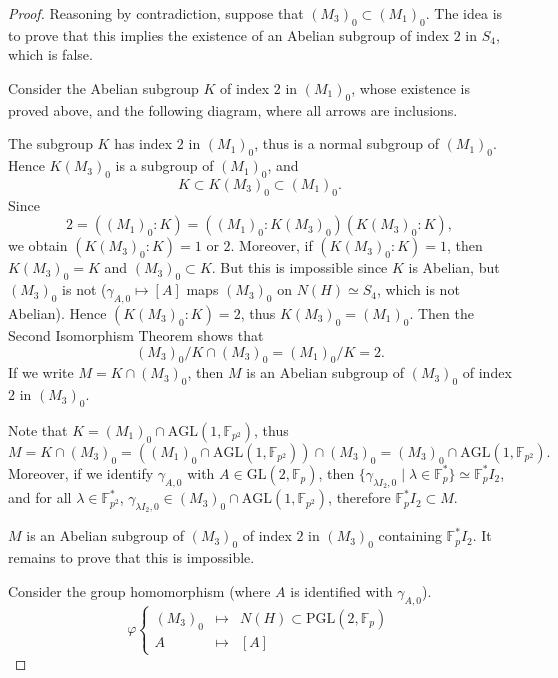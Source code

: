 \documentclass[11pt,a4paper]{article}
\newcommand{\F}{\mathbb{F}}
\begin{document}
{\begin{proof}
Reasoning by contradiction, suppose that $(M_3)_0 \subset (M_1)_0$. The idea is to prove that this implies the existence of an Abelian subgroup of index $2$ in $S_4$, which is false.

Consider the Abelian subgroup $K$ of index $2$ in $(M_1)_0$, whose existence is proved above, and the following diagram, where all arrows are inclusions. 

\begin{center}
\end{center}


The subgroup $K$ has index $2$ in $(M_1)_0$, thus is a normal subgroup of $(M_1)_0$. Hence $K (M_3)_0$ is a subgroup of $(M_1)_0$, and
$$K \subset K(M_3)_0 \subset (M_1)_0.$$
Since 
$$2 = ((M_1)_0 : K) = ((M_1)_0 : K(M_3)_0)(K(M_3)_0 : K),$$
we obtain $(K(M_3)_0 : K) = 1$ or $2$. Moreover, if $(K(M_3)_0 : K) = 1$, then $K(M_3)_0 = K$ and $(M_3)_0 \subset K$. But this is impossible since $K$ is Abelian, but $(M_3)_0$ is not ($\gamma_{A,0} \mapsto [A]$ maps $(M_3)_0$ on $N(H) \simeq S_4$, which is not Abelian). Hence $(K(M_3)_0 : K) = 2$, thus $K(M_3)_0 = (M_1)_0$. Then the Second Isomorphism Theorem shows that
$$(M_3)_0/ K \cap (M_3)_0 = (M_1)_0/K = 2.$$
If we write $ M= K\cap (M_3)_0$, then $M$ is an Abelian subgroup of $(M_3)_0$ of index $2$ in $(M_3)_0$. 

Note that $K = (M_1)_0 \cap \mathrm{AGL}(1,\F_{p^2})$, thus
$$M = K \cap (M_3)_0 = ((M_1)_0 \cap \mathrm{AGL}(1,\F_{p^2})) \cap (M_3)_0 = (M_3)_0 \cap \mathrm{AGL}(1,\F_{p^2}).$$
Moreover, if we identify $\gamma_{A,0}$ with $A \in \mathrm{GL}(2,\F_p)$, then $\{\gamma_{\lambda I_2,0} \mid \lambda \in \F_{p}^* \} \simeq \F_p^* I_2$, and for all $\lambda \in \F_{p^2}^*$, $\gamma_{\lambda I_2,0} \in (M_3)_0 \cap \mathrm{AGL}(1,\F_{p^2})$, therefore $\F_p^* I_2 \subset M$.


$M$ is an Abelian subgroup of $(M_3)_0$ of index $2$ in $(M_3)_0$ containing $\F_p^* I_2$. It remains to prove that this is impossible.

Consider the group homomorphism (where $A$ is identified with $\gamma_{A,0}$).
$$
\varphi
\left\{
\begin{array}{ccl}
(M_3)_0 & \mapsto & N(H) \subset \mathrm{PGL}(2,\F_p)\\
A & \mapsto &[A]
\end{array}
\right.
$$


\end{proof}}
\end{document}
